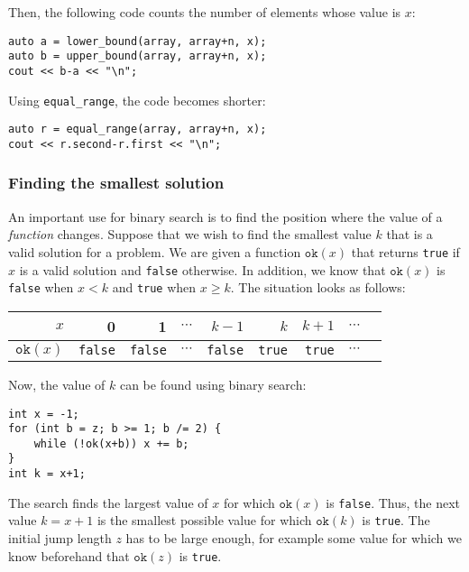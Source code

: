 Then, the following code counts the number of elements
whose value is $x$:

\begin{lstlisting}
auto a = lower_bound(array, array+n, x);
auto b = upper_bound(array, array+n, x);
cout << b-a << "\n";
\end{lstlisting}

Using \texttt{equal\_range}, the code becomes shorter:

\begin{lstlisting}
auto r = equal_range(array, array+n, x);
cout << r.second-r.first << "\n";
\end{lstlisting}

\subsubsection{Finding the smallest solution}

An important use for binary search is
to find the position where the value of a \emph{function} changes.
Suppose that we wish to find the smallest value $k$
that is a valid solution for a problem.
We are given a function $\texttt{ok}(x)$
that returns \texttt{true} if $x$ is a valid solution
and \texttt{false} otherwise.
In addition, we know that $\texttt{ok}(x)$ is \texttt{false}
when $x<k$ and \texttt{true} when $x \ge k$.
The situation looks as follows:

\begin{center}
\begin{tabular}{r|rrrrrrrr}
$x$ & 0 & 1 & $\cdots$ & $k-1$ & $k$ & $k+1$ & $\cdots$ \\
\hline
$\texttt{ok}(x)$ & \texttt{false} & \texttt{false}
& $\cdots$ & \texttt{false} & \texttt{true} & \texttt{true} & $\cdots$ \\
\end{tabular}
\end{center}

\noindent
Now, the value of $k$ can be found using binary search:

\begin{lstlisting}
int x = -1;
for (int b = z; b >= 1; b /= 2) {
    while (!ok(x+b)) x += b;
}
int k = x+1;
\end{lstlisting}

The search finds the largest value of $x$ for which
$\texttt{ok}(x)$ is \texttt{false}.
Thus, the next value $k=x+1$
is the smallest possible value for which
$\texttt{ok}(k)$ is \texttt{true}.
The initial jump length $z$ has to be
large enough, for example some value
for which we know beforehand that $\texttt{ok}(z)$ is \texttt{true}.


